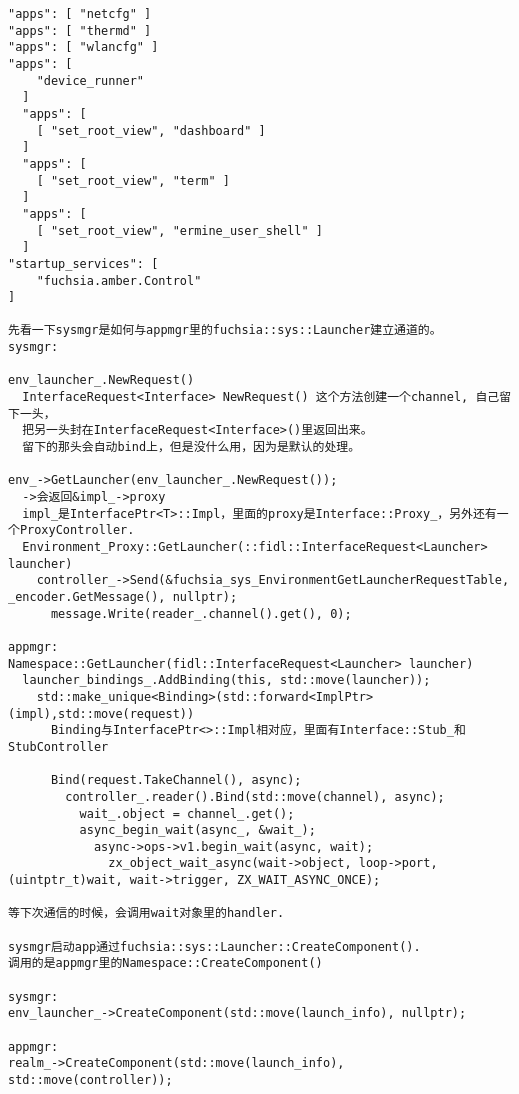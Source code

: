 \begin{verbatim}
"apps": [ "netcfg" ]
"apps": [ "thermd" ]
"apps": [ "wlancfg" ]
"apps": [
    "device_runner"
  ]
  "apps": [
    [ "set_root_view", "dashboard" ]
  ]
  "apps": [
    [ "set_root_view", "term" ]
  ]
  "apps": [
    [ "set_root_view", "ermine_user_shell" ]
  ]
"startup_services": [
    "fuchsia.amber.Control"
]

先看一下sysmgr是如何与appmgr里的fuchsia::sys::Launcher建立通道的。
sysmgr:

env_launcher_.NewRequest()
  InterfaceRequest<Interface> NewRequest() 这个方法创建一个channel, 自己留下一头，
  把另一头封在InterfaceRequest<Interface>()里返回出来。
  留下的那头会自动bind上，但是没什么用，因为是默认的处理。

env_->GetLauncher(env_launcher_.NewRequest());
  ->会返回&impl_->proxy
  impl_是InterfacePtr<T>::Impl，里面的proxy是Interface::Proxy_，另外还有一个ProxyController.
  Environment_Proxy::GetLauncher(::fidl::InterfaceRequest<Launcher> launcher)
    controller_->Send(&fuchsia_sys_EnvironmentGetLauncherRequestTable, _encoder.GetMessage(), nullptr);
      message.Write(reader_.channel().get(), 0);

appmgr:
Namespace::GetLauncher(fidl::InterfaceRequest<Launcher> launcher)
  launcher_bindings_.AddBinding(this, std::move(launcher));
    std::make_unique<Binding>(std::forward<ImplPtr>(impl),std::move(request))
      Binding与InterfacePtr<>::Impl相对应，里面有Interface::Stub_和StubController

      Bind(request.TakeChannel(), async);
        controller_.reader().Bind(std::move(channel), async);
          wait_.object = channel_.get();
          async_begin_wait(async_, &wait_);
            async->ops->v1.begin_wait(async, wait);
              zx_object_wait_async(wait->object, loop->port, (uintptr_t)wait, wait->trigger, ZX_WAIT_ASYNC_ONCE);

等下次通信的时候，会调用wait对象里的handler.

sysmgr启动app通过fuchsia::sys::Launcher::CreateComponent().  
调用的是appmgr里的Namespace::CreateComponent()

sysmgr:
env_launcher_->CreateComponent(std::move(launch_info), nullptr);

appmgr:
realm_->CreateComponent(std::move(launch_info), std::move(controller));

\end{verbatim}
